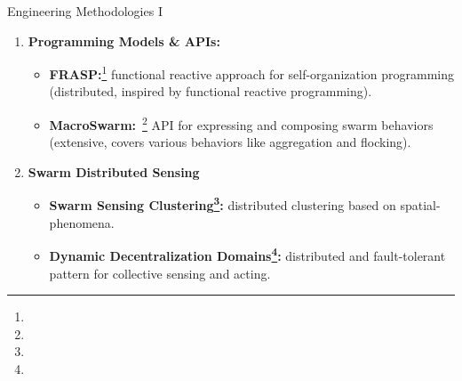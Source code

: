 \documentclass[presentation, 8pt,169]{beamer}\mode<presentation>{\usetheme{AMSBolognaFC}}
\begin{document}
\begin{frame}[fragile]{Engineering Methodologies I}

  \begin{enumerate}
  \item \textbf{Programming Models \& APIs:}
  
  \begin{itemize}
  \item \textbf{FRASP:}\footnote{} functional reactive approach for self-organization programming (distributed, inspired by functional reactive programming).
  \item \textbf{MacroSwarm:}~\footnote{} API for expressing and composing swarm behaviors (extensive, covers various behaviors like aggregation and flocking).
  \end{itemize}

  \item \textbf{Swarm Distributed Sensing}
  
  \begin{itemize}
  \item \textbf{Swarm Sensing Clustering\footnote{}:} distributed clustering based on spatial-phenomena.
  \item \textbf{Dynamic Decentralization Domains\footnote{}:} distributed and fault-tolerant pattern for collective sensing and acting.
  \end{itemize}
\end{enumerate}

\end{frame}
\end{document}
